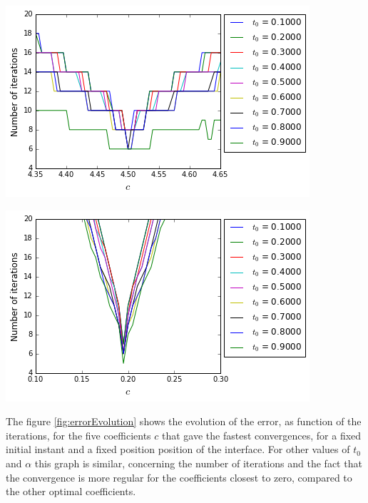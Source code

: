 \begin{minipage}{.5\linewidth}
\begin{center}
	\includegraphics[scale=.4]{figures/FinalFigures/NiterxCoefVarInterfaceFinalVersionPDetail.png}
\end{center}
\end{minipage}
\begin{minipage}{.5\linewidth}
\begin{center}
	\includegraphics[scale=.4]{figures/FinalFigures/NiterxCoefVarInterfaceFinalVersionPDetail2.png}
\end{center}
\end{minipage}
\endgroup

\indent The figure \ref{fig:errorEvolution} shows the evolution of the error, as function of the iterations, for the five coefficients $c$ that gave the fastest convergences, for a fixed initial instant and a fixed position position of the interface. For other values of $t_0$ and $\alpha$ this graph is similar, concerning the number of iterations and the fact that the convergence is more regular for the coefficients closest to zero, compared to the other optimal coefficients.

